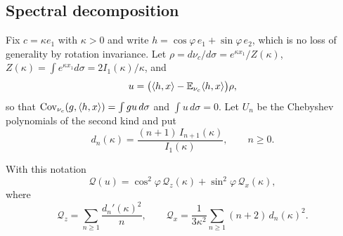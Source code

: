 \subsection{Spectral decomposition}

Fix $c=\kappa e_1$ with $\kappa>0$ and write $h=\cos\varphi\,e_1+\sin\varphi
\,e_2$, which is no loss of generality by rotation invariance. Let
$\rho=d\nu_c/d\sigma=e^{\kappa x_1}/Z(\kappa)$, $Z(\kappa)=\int e^{\kappa x_1}
d\sigma=2I_1(\kappa)/\kappa$, and
\[
u=\bigl(\langle h,x\rangle-\mathbb{E}_{\nu_c}\langle h,x\rangle\bigr)\rho ,
\]
so that $\operatorname{Cov}_{\nu_c}(g,\langle h,x\rangle)=\int gu\,d\sigma$ and $\int u\,d\sigma=0$.
Let $U_n$ be the Chebyshev polynomials of the second kind and put
\begin{equation}\label{q-eq:dn}
d_n(\kappa)=\frac{(n+1)\,I_{n+1}(\kappa)}{I_1(\kappa)},\qquad n\ge0 .
\end{equation}

\begin{lemma}\label{q-lem:spectral}
With this notation
\[
\mathcal Q(u)=\cos^2\varphi\,\mathcal Q_z(\kappa)+\sin^2\varphi\,
\mathcal Q_x(\kappa),
\]
where
\[
\mathcal Q_z=\sum_{n\ge1}\frac{d_n'(\kappa)^2}n,\qquad
\mathcal Q_x=\frac1{3\kappa^2}\sum_{n\ge1}(n+2)\,d_n(\kappa)^2 .
\]
\end{lemma}

